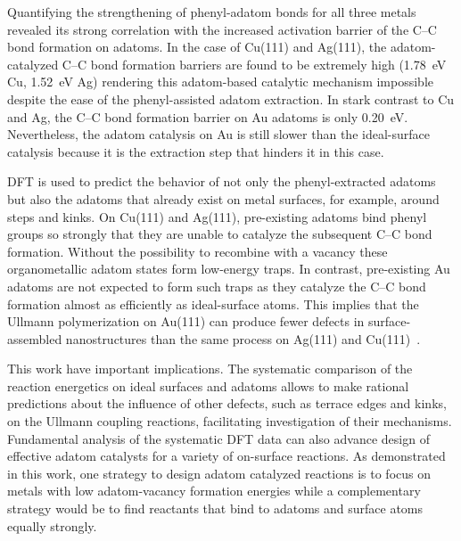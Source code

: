 \documentclass[aps,prb,amsmath,amssymb,11pt]{revtex4-1}
\begin{document}
Quantifying the strengthening of phenyl-adatom bonds for all three metals revealed its strong correlation with the increased activation barrier of the C--C bond formation on adatoms. In the case of Cu(111) and Ag(111), the adatom-catalyzed C--C bond formation barriers are found to be extremely high (\SI{1.78}{\electronvolt} Cu, \SI{1.52}{\electronvolt} Ag) rendering this adatom-based catalytic mechanism impossible despite the ease of the phenyl-assisted adatom extraction. 
In stark contrast to Cu and Ag, the C--C bond formation barrier on Au adatoms is only \SI{0.20}{\electronvolt}. Nevertheless, the adatom catalysis on Au is still slower than the ideal-surface catalysis because it is the extraction step that hinders it in this case.

DFT is used to predict the behavior of not only the phenyl-extracted adatoms but also the adatoms that already exist on metal surfaces, for example, around steps and kinks. On Cu(111) and Ag(111), pre-existing adatoms bind phenyl groups so strongly that they are unable to catalyze the subsequent C--C bond formation. Without the possibility to recombine with a vacancy these organometallic adatom states form low-energy traps. In contrast, pre-existing Au adatoms are not expected to form such traps as they catalyze the C--C bond formation almost as efficiently as ideal-surface atoms. This implies that the Ullmann polymerization on Au(111) can produce fewer defects in surface-assembled nanostructures than the same process on Ag(111) and Cu(111)~\cite{ullmann_65}.

This work have important implications. The systematic comparison of the reaction energetics on ideal surfaces and adatoms allows to make rational predictions about the influence of other defects, such as terrace edges and kinks, on the Ullmann coupling reactions, facilitating investigation of their mechanisms.
Fundamental analysis of the systematic DFT data can also advance design of effective adatom catalysts for a variety of on-surface reactions. As demonstrated in this work, one strategy to design adatom catalyzed reactions is to focus on metals with low adatom-vacancy formation energies while a complementary strategy would be to find reactants that bind to adatoms and surface atoms equally strongly. 
\end{document}
